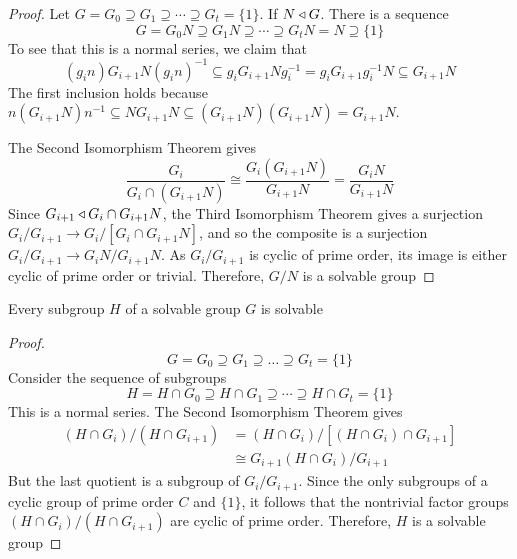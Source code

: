 \documentclass[11pt]{article}
\begin{document}
\begin{proof}
Let \(G=G_0\supseteq G_1\supseteq\cdots\supseteq G_t=\{1\}\). 
If \(N\triangleleft G\). There is a sequence
\begin{equation*}
G=G_0N\supseteq G_1N\supseteq\cdots\supseteq G_tN=N\supseteq\{1\}
\end{equation*}
To see that this is a normal series, we claim that
\begin{equation*}
(g_in)G_{i+1}N(g_in)^{-1}\subseteq
g_iG_{i+1}Ng_i^{-1}=g_iG_{i+1}g_i^{-1}N\subseteq G_{i+1}N
\end{equation*}
The first inclusion holds because
\(n(G_{i+1}N)n^{-1}\subseteq NG_{i+1}N\subseteq
    (G_{i+1}N)(G_{i+1}N)=G_{i+1}N\). 

The Second Isomorphism Theorem gives
\begin{equation*}
\frac{G_i}{G_i\cap(G_{i+1}N)}\cong
\frac{G_i(G_{i+1}N)}{G_{i+1}N}=
\frac{G_iN}{G_{i+1}N}
\end{equation*}
Since \(G_{i+1}\triangleleft G_i\cap G_{i+1}N\), the Third Isomorphism Theorem gives
a surjection \(G_i/G_{i+1}\to G_i/[G_i\cap G_{i+1}N]\), and so the composite
is a surjection \(G_i/G_{i+1}\to G_iN/G_{i+1}N\). As \(G_i/G_{i+1}\) is
cyclic of prime order, its image is either cyclic of prime order or trivial.
Therefore, \(G/N\) is a solvable group
\end{proof}

\begin{proposition}[]
Every subgroup \(H\) of a solvable group \(G\) is solvable
\end{proposition}

\begin{proof}
\begin{equation*}
G=G_0\supseteq G_1\supseteq\dots\supseteq G_t=\{1\}
\end{equation*}
Consider the sequence of subgroups
\begin{equation*}
H=H\cap G_0\supseteq H\cap G_1\supseteq\cdots\supseteq H\cap G_t=\{1\}
\end{equation*}
This is a normal series. The Second Isomorphism Theorem gives
\begin{align*}
(H\cap G_i)/(H\cap G_{i+1})&=(H\cap G_i)/[(H\cap G_i)\cap G_{i+1}]\\
&\cong G_{i+1}(H\cap G_i)/G_{i+1}
\end{align*}
But the last quotient is a subgroup of \(G_i/G_{i+1}\). Since the only
subgroups of a cyclic group of prime order \(C\) and \(\{1\}\), it follows
that the nontrivial factor groups \((H\cap G_i)/(H\cap G_{i+1})\) are cyclic
of prime order. Therefore, \(H\) is a solvable group
\end{proof}
\end{document}
